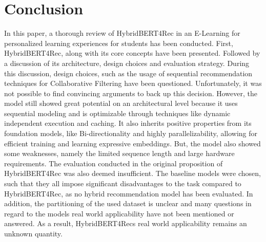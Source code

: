 \documentclass{Academic}
\begin{document}
    \section{Conclusion}
    In this paper, a thorough review of HybridBERT4Rec in an E-Learning for personalized learning experiences for students has been conducted. First, HybridBERT4Rec, along with its core concepts have been presented. Followed by a discussion of its architecture, design choices and evaluation strategy. During this discussion, design choices, such as the usage of sequential recommendation techniques for Collaborative Filtering have been questioned. Unfortunately, it was not possible to find convincing arguments to back up this decision. However, the model still showed great potential on an architectural level because it uses sequential modeling and is optimizable through techniques like dynamic independent execution and caching. It also inherits positive properties from its foundation models, like Bi-directionality and highly parallelizability, allowing for efficient training and learning expressive embeddings. But, the model also showed some weaknesses, namely the limited sequence length and large hardware requirements. The evaluation conducted in the original proposition of HybridBERT4Rec was also deemed insufficient. The baseline models were chosen, such that they all impose significant disadvantages to the task compared to HybridBERT4Rec, as no hybrid recommendation model has been evaluated. In addition, the partitioning of the used dataset is unclear and many questions in regard to the models real world applicability have not been mentioned or answered. As a result, HybridBERT4Recs real world applicability remains an unknown quantity.\\
\end{document}
